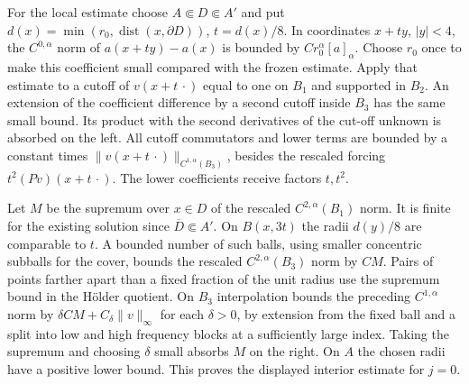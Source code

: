 \documentclass[
  english,
  11pt,
  reqno]{amsart}
\begin{document}
For the local estimate choose \(A\Subset D\Subset A'\) and put
\(d(x)=\allowbreak\min(r_0,\allowbreak\operatorname{dist}(x,\partial D))\), \(t=d(x)/8\). In
coordinates \(x+ty\), \(|y|<4\), the \(C^{0,\alpha}\) norm of
\(a(x+ty)-a(x)\) is bounded by \(C r_0^\alpha[a]_\alpha\). Choose
\(r_0\) once to make this coefficient small compared with the frozen
estimate. Apply that estimate to a cutoff of \(v(x+t\,\cdot)\) equal to
one on \(B_1\) and supported in \(B_2\). An extension of the coefficient
difference by a second cutoff inside \(B_3\) has the same small bound.
Its product with the second derivatives of the cut-off unknown is
absorbed on the left. All cutoff commutators and lower terms are bounded
by a constant times \(\|v(x+t\,\cdot)\|_{C^{1,\alpha}(B_3)}\), besides
the rescaled forcing \(t^2(Pv)(x+t\,\cdot)\). The lower coefficients
receive factors \(t,t^2\).

Let \(M\) be the supremum over \(x\in D\) of the rescaled
\(C^{2,\alpha}(B_1)\) norm. It is finite for the existing solution since
\(\overline D\Subset A'\). On \(B(x,3t)\) the radii \(d(y)/8\) are
comparable to \(t\). A bounded number of such balls, using smaller
concentric subballs for the cover, bounds the rescaled
\(C^{2,\alpha}(B_3)\) norm by \(C M\). Pairs of points farther apart
than a fixed fraction of the unit radius use the supremum bound in the
Hölder quotient. On \(B_3\) interpolation bounds the preceding
\(C^{1,\alpha}\) norm by \(\delta C M+C_\delta\|v\|_\infty\) for each
\(\delta>0\), by extension from the fixed ball and a split into low and
high frequency blocks at a sufficiently large index. Taking the supremum
and choosing \(\delta\) small absorbs \(M\) on the right. On \(A\) the
chosen radii have a positive lower bound. This proves the displayed
interior estimate for \(j=0\).
\end{document}
